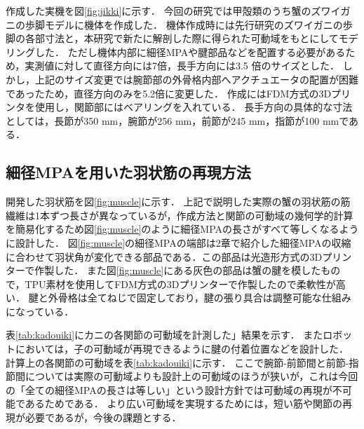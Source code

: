 \documentclass{jarticle}
\begin{document}
作成した実機を図\ref{fig:jikki}に示す．
今回の研究では甲殻類のうち蟹のズワイガニの歩脚モデルに機体を作成した．
機体作成時には先行研究\cite{crabrobot2}のズワイガニの歩脚の各部寸法と，本研究で新たに解剖した際に得られた可動域をもとにしてモデリングした．
ただし機体内部に細径MPAや腱部品などを配置する必要があるため，実測値に対して直径方向には7倍，長手方向には3.5 倍のサイズとした．
しかし，上記のサイズ変更では腕節部の外骨格内部へアクチュエータの配置が困難であったため，直径方向のみを5.2倍に変更した．
作成にはFDM方式の3Dプリンタを使用し，関節部にはベアリングを入れている．
長手方向の具体的な寸法としては，長節が350 mm，腕節が256 mm，前節が245 mm，指節が100 mmである．
\subsection{細径MPAを用いた羽状筋の再現方法}

開発した羽状筋を図\ref{fig:muscle}に示す．
上記で説明した実際の蟹の羽状筋の筋繊維は1本ずつ長さが異なっているが，作成方法と関節の可動域の幾何学的計算を簡易化するため図\ref{fig:muscle}のように細径MPAの長さがすべて等しくなるように設計した．
図\ref{fig:muscle}の細径MPAの端部は2章で紹介した細径MPAの収縮に合わせて羽状角が変化できる部品である．この部品は光造形方式の3Dプリンターで作製した．
また図\ref{fig:muscle}にある灰色の部品は蟹の腱を模したもので，TPU素材を使用してFDM方式の3Dプリンターで作製したので柔軟性が高い．
腱と外骨格は全てねじで固定しており，腱の張り具合は調整可能な仕組みになっている．

表\ref{tab:kadouiki}にカニの各関節の可動域を計測した」結果を示す．
またロボットにおいては，子の可動域が再現できるように腱の付着位置などを設計した．
計算上の各関節の可動域を表\ref{tab:kadouiki}に示す．
ここで腕節-前節間と前節-指節間については実際の可動域よりも設計上の可動域のほうが狭いが，これは今回の「全ての細径MPAの長さは等しい」という設計方針では可動域の再現が不可能であるためである．
より広い可動域を実現するためには，短い筋や関節の再現が必要であるが，今後の課題とする．

\end{document}
